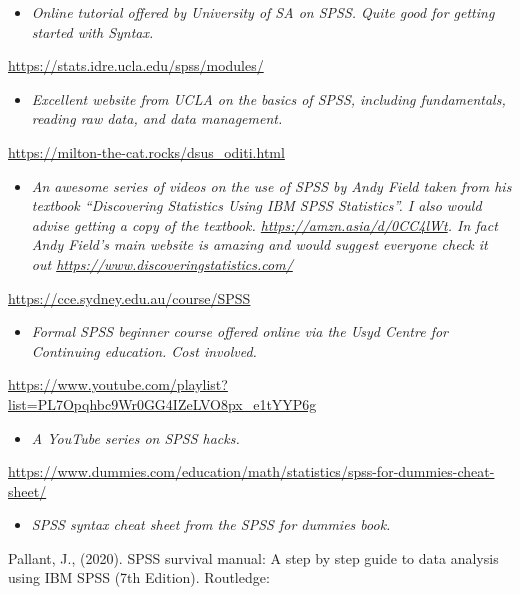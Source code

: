 \documentclass[
]{book}
\providecommand{\tightlist}{%
  \setlength{\itemsep}{0pt}\setlength{\parskip}{0pt}}
\begin{document}
\begin{itemize}
\tightlist
\item
  \emph{Online tutorial offered by University of SA on SPSS. Quite good for getting started with Syntax.}
\end{itemize}

\url{https://stats.idre.ucla.edu/spss/modules/}

\begin{itemize}
\tightlist
\item
  \emph{Excellent website from UCLA on the basics of SPSS, including fundamentals, reading raw data, and data management.}
\end{itemize}

\url{https://milton-the-cat.rocks/dsus_oditi.html}

\begin{itemize}
\tightlist
\item
  \emph{An awesome series of videos on the use of SPSS by Andy Field taken from his textbook ``Discovering Statistics Using IBM SPSS Statistics''. I also would advise getting a copy of the textbook. \url{https://amzn.asia/d/0CC4lWt}. In fact Andy Field's main website is amazing and would suggest everyone check it out \url{https://www.discoveringstatistics.com/}}
\end{itemize}

\url{https://cce.sydney.edu.au/course/SPSS}

\begin{itemize}
\tightlist
\item
  \emph{Formal SPSS beginner course offered online via the Usyd Centre for Continuing education. Cost involved. }
\end{itemize}

\url{https://www.youtube.com/playlist?list=PL7Opqhbc9Wr0GG4IZeLVO8px_e1tYYP6g}

\begin{itemize}
\tightlist
\item
  \emph{A YouTube series on SPSS hacks.}
\end{itemize}

\url{https://www.dummies.com/education/math/statistics/spss-for-dummies-cheat-sheet/}

\begin{itemize}
\tightlist
\item
  \emph{SPSS syntax cheat sheet from the SPSS for dummies book. }
\end{itemize}

Pallant, J., (2020). SPSS survival manual: A step by step guide to data analysis using IBM SPSS (7th Edition). Routledge:
\end{document}
